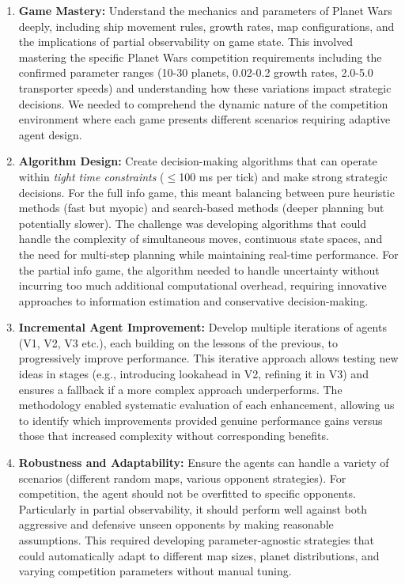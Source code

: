 \documentclass[conference]{IEEEtran}
\begin{document}
\begin{enumerate}
\item \textbf{Game Mastery:} Understand the mechanics and parameters of Planet Wars deeply, including ship movement rules, growth rates, map configurations, and the implications of partial observability on game state. This involved mastering the specific Planet Wars competition requirements including the confirmed parameter ranges (10-30 planets, 0.02-0.2 growth rates, 2.0-5.0 transporter speeds) and understanding how these variations impact strategic decisions. We needed to comprehend the dynamic nature of the competition environment where each game presents different scenarios requiring adaptive agent design.

\item \textbf{Algorithm Design:} Create decision-making algorithms that can operate within \textit{tight time constraints} ($\leq$100 ms per tick) and make strong strategic decisions. For the full info game, this meant balancing between pure heuristic methods (fast but myopic) and search-based methods (deeper planning but potentially slower). The challenge was developing algorithms that could handle the complexity of simultaneous moves, continuous state spaces, and the need for multi-step planning while maintaining real-time performance. For the partial info game, the algorithm needed to handle uncertainty without incurring too much additional computational overhead, requiring innovative approaches to information estimation and conservative decision-making.

\item \textbf{Incremental Agent Improvement:} Develop multiple iterations of agents (V1, V2, V3 etc.), each building on the lessons of the previous, to progressively improve performance. This iterative approach allows testing new ideas in stages (e.g., introducing lookahead in V2, refining it in V3) and ensures a fallback if a more complex approach underperforms. The methodology enabled systematic evaluation of each enhancement, allowing us to identify which improvements provided genuine performance gains versus those that increased complexity without corresponding benefits.

\item \textbf{Robustness and Adaptability:} Ensure the agents can handle a variety of scenarios (different random maps, various opponent strategies). For competition, the agent should not be overfitted to specific opponents. Particularly in partial observability, it should perform well against both aggressive and defensive unseen opponents by making reasonable assumptions. This required developing parameter-agnostic strategies that could automatically adapt to different map sizes, planet distributions, and varying competition parameters without manual tuning.


\end{enumerate}
\end{document}
